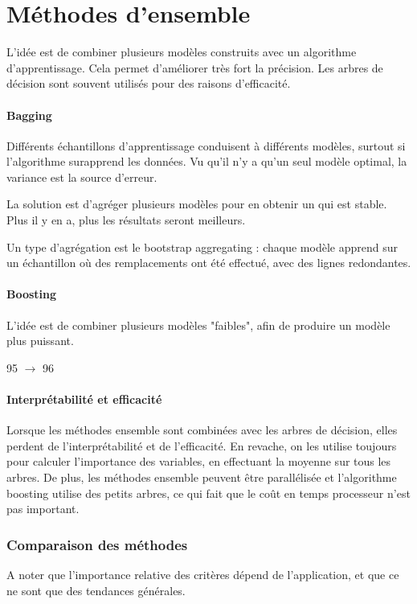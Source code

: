 \chapter{Méthodes d'ensemble}

L'idée est de combiner plusieurs modèles construits avec un algorithme d'apprentissage. Cela permet d'améliorer très fort la précision. Les arbres de décision sont souvent utilisés pour des raisons d'efficacité.

	\subsubsection{Bagging}
	
	Différents échantillons d'apprentissage conduisent à différents modèles, surtout si l'algorithme surapprend les données. Vu qu'il n'y a qu'un seul modèle optimal, la variance est la source d'erreur.
	
	La solution est d'agréger plusieurs modèles pour en obtenir un qui est stable. Plus il y en a, plus les résultats seront meilleurs.
	
	
	Un type d'agrégation est le bootstrap aggregating : chaque modèle apprend sur un échantillon où des remplacements ont été effectué, avec des lignes redondantes.
	
	
	
	\subsubsection{Boosting}
	
	L'idée est de combiner plusieurs modèles "faibles", afin de produire un modèle plus puissant.
	
	95 $\rightarrow$ 96
	
	\subsubsection{Interprétabilité et efficacité}
	
	Lorsque les méthodes ensemble sont combinées avec les arbres de décision, elles perdent de l'interprétabilité et de l'efficacité. En revache, on les utilise toujours pour calculer l'importance des variables, en effectuant la moyenne sur tous les arbres. De plus, les méthodes ensemble peuvent être parallélisée et l'algorithme boosting utilise des petits arbres, ce qui fait que le coût en temps processeur n'est pas important.
	
	\subsection{Comparaison des méthodes}
	

	A noter que l'importance relative des critères dépend de l'application, et que ce ne sont que des tendances générales.
	
